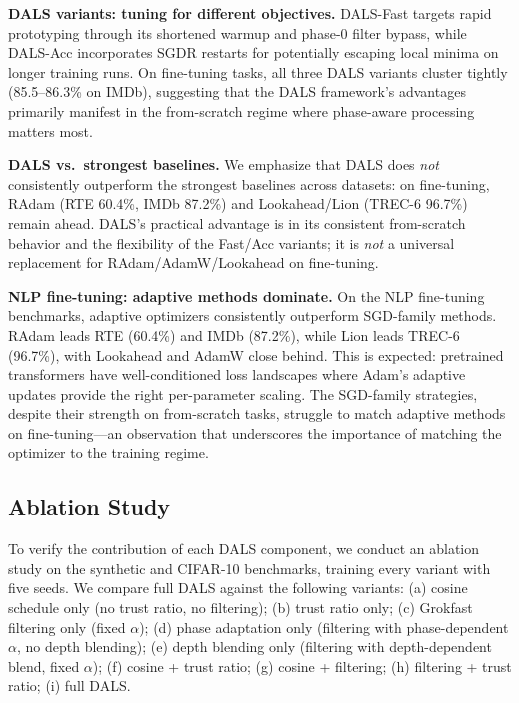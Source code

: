 \documentclass[a4paper,fleqn]{cas-dc}
\begin{document}
\textbf{DALS variants: tuning for different objectives.} DALS-Fast targets rapid prototyping through its shortened warmup and phase-0 filter bypass, while DALS-Acc incorporates SGDR restarts for potentially escaping local minima on longer training runs. On fine-tuning tasks, all three DALS variants cluster tightly (85.5--86.3\% on IMDb), suggesting that the DALS framework's advantages primarily manifest in the from-scratch regime where phase-aware processing matters most.

\textbf{DALS vs.\ strongest baselines.} We emphasize that DALS does \emph{not} consistently outperform the strongest baselines across datasets: on fine-tuning, RAdam (RTE 60.4\%, IMDb 87.2\%) and Lookahead/Lion (TREC-6 96.7\%) remain ahead. DALS's practical advantage is in its consistent from-scratch behavior and the flexibility of the Fast/Acc variants; it is \emph{not} a universal replacement for RAdam/AdamW/Lookahead on fine-tuning.

\textbf{NLP fine-tuning: adaptive methods dominate.} On the NLP fine-tuning benchmarks, adaptive optimizers consistently outperform SGD-family methods. RAdam leads RTE (60.4\%) and IMDb (87.2\%), while Lion leads TREC-6 (96.7\%), with Lookahead and AdamW close behind. This is expected: pretrained transformers have well-conditioned loss landscapes where Adam's adaptive updates provide the right per-parameter scaling. The SGD-family strategies, despite their strength on from-scratch tasks, struggle to match adaptive methods on fine-tuning---an observation that underscores the importance of matching the optimizer to the training regime.

\subsection{Ablation Study}\label{sec:ablation}

To verify the contribution of each DALS component, we conduct an ablation study on the synthetic and CIFAR-10 benchmarks, training every variant with five seeds. We compare full DALS against the following variants: (a) cosine schedule only (no trust ratio, no filtering); (b) trust ratio only; (c) Grokfast filtering only (fixed $\alpha$); (d) phase adaptation only (filtering with phase-dependent $\alpha$, no depth blending); (e) depth blending only (filtering with depth-dependent blend, fixed $\alpha$); (f) cosine + trust ratio; (g) cosine + filtering; (h) filtering + trust ratio; (i) full DALS.
\end{document}
